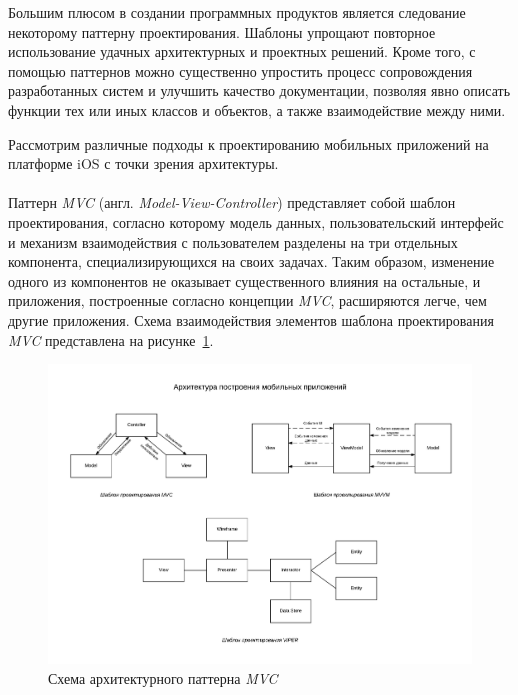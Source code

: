 Большим плюсом в создании программных продуктов является следование некоторому
паттерну проектирования. Шаблоны упрощают повторное использование удачных
архитектурных и проектных решений.
Кроме того, с помощью паттернов можно существенно
упростить процесс сопровождения разработанных систем и улучшить
качество документации, позволяя явно описать функции тех или иных
классов и объектов, а также взаимодействие между ними.

Рассмотрим различные подходы к проектированию мобильных приложений на платформе
iOS с точки зрения архитектуры.



\paragraph{}

Паттерн \textit{MVC} (англ. \textit{Model-View-Controller}) представляет
собой шаблон проектирования, согласно которому модель данных,
пользовательский интерфейс и механизм взаимодействия с пользователем разделены
на три отдельных компонента, специализирующихся на своих задачах.
Таким образом, изменение одного из компонентов не оказывает существенного
влияния на остальные, и приложения, построенные согласно концепции \textit{MVC},
расширяются легче, чем другие приложения.
Схема взаимодействия элементов шаблона проектирования \textit{MVC}
представлена на рисунке~\ref{fig:mvc}.
\begin{figure}[h!]
  \centering
  \includegraphics[width=140mm]{fig/mvc}
  \caption{Схема архитектурного паттерна \textit{MVC}}
  \label{fig:mvc}
\end{figure}

